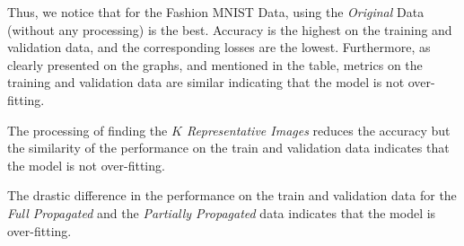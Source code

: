 \documentclass[10pt]{article}
\begin{document}
    \begin{mdframed}
        Thus, we notice that for the Fashion MNIST Data, using the \emph{Original} Data (without any processing) is the best. Accuracy is the highest on the training and validation data, and the corresponding losses are the lowest. Furthermore, as clearly presented on the graphs, and mentioned in the table, metrics on the training and validation data are similar indicating that the model is not over-fitting.

        The processing of finding the \emph{$K$ Representative Images} reduces the accuracy but the similarity of the performance on the train and validation data indicates that the model is not over-fitting.

        The drastic difference in the performance on the train and validation data for the \emph{Full Propagated} and the \emph{Partially Propagated} data indicates that the model is over-fitting.
    \end{mdframed}
        
\end{document}
